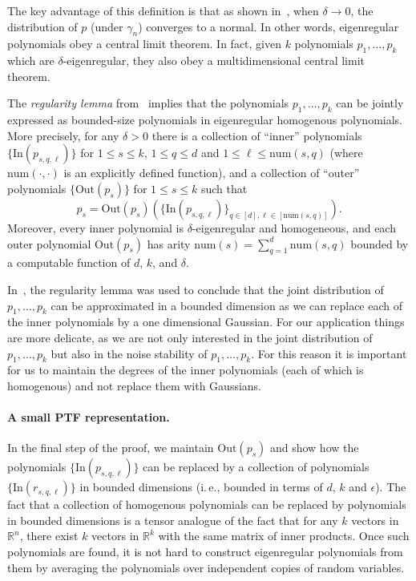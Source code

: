 \documentclass[11pt]{article}
\numberwithin{equation}{section}
\theoremstyle{definition}
\theoremstyle{plain}
\newcommand{\ie}{i.\,e.}
\newcommand{\Inner}{\mathrm{In}}
\newcommand{\Outer}{\mathrm{Out}}
\newcommand{\num}{\mathrm{num}}
\begin{document}
  The key advantage of this definition is that as shown in~\cite{DS14}, when $\delta \rightarrow 0$, the distribution of $p$ (under $\gamma_n$) converges to a normal.  In other words, eigenregular polynomials obey a central limit theorem.  In fact, given $k$ polynomials $p_1, \ldots, p_k$ which are $\delta$-eigenregular, they also obey a multidimensional central limit theorem.  
  
The \emph{regularity lemma} from~\cite{DS14} implies that the polynomials
$p_1,\ldots,p_k$ can be jointly expressed as bounded-size
polynomials in eigenregular homogenous polynomials. More precisely,
for any $\delta > 0$ there is a collection of ``inner'' polynomials
$\{\Inner(p_{s, q, \ell })\}$ for $1 \le s \le k$, $1 \le q \le d$ and $1 \le
\ell \le \num(s,q)$ (where $\num(\cdot, \cdot)$ is an explicitly defined
function), and a collection of ``outer'' polynomials $\{\Outer(p_s)\}$
for $1 \le s \le k$ such that
\[
    p_s = \Outer(p_s) (\{\Inner(p_{s,q, \ell})\}_{q \in [d], \ell \in [\num(s,q)]}).
\]
Moreover, every inner polynomial is $\delta$-eigenregular and homogeneous, and
each outer polynomial $\Outer(p_s)$ has arity
$\num(s) = \sum_{q=1}^d \num(s,q)$
bounded by a computable function of $d$, $k$, and $\delta$.

In~\cite{DS14}, the regularity lemma was used to conclude that the joint
distribution of $p_1,\ldots,p_k$ can be approximated in a bounded dimension as
we can replace each of the inner polynomials by a one dimensional Gaussian. For
our application things are more delicate, as we are not only interested in the
joint distribution of $p_1,\ldots,p_k$ but also in the noise stability of
$p_1,\ldots,p_k$.  For this reason it is important for us to maintain the
degrees of the inner polynomials (each of which is homogenous) and not replace
them with Gaussians.

\paragraph{A small PTF representation.}
In the final step of the proof, we maintain $\Outer(p_s)$ and show how the polynomials 
$\{\Inner(p_{s,q, \ell})\}$ can be replaced by a collection of polynomials $\{\Inner(r_{s,q, \ell})\}$ in bounded dimensions (\ie, bounded in terms of $d$, $k$ and $\epsilon$).
The fact that a collection of homogenous polynomials can be replaced by polynomials in bounded dimensions is a tensor analogue of the fact that for any $k$  vectors in $\mathbb{R}^n$, there exist $k$ vectors in $\mathbb{R}^k$ with the same matrix of inner products. Once such polynomials are found, it is not hard to construct eigenregular polynomials from them by averaging the polynomials over independent copies of random variables.  
\end{document}
